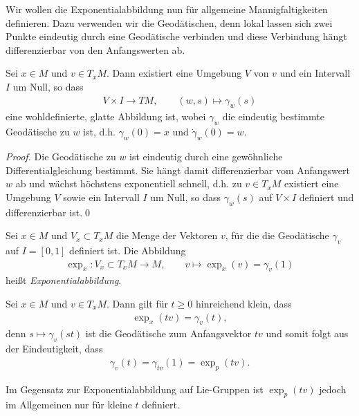 \documentclass[%
	paper=a5,%
	fleqn,%
	DIV=18,%
	BCOR=0mm,
	fontsize=11pt,
	titlepage=false,%
	bibliography=totoc,
	DIV=18,%
	twoside=true,
	pdftitle=Riemannsche Geometrie,
	pdfauthor=Uwe Semmelmann,
	numbers=noendperiod]%
	{scrbook}
\begin{document}
Wir wollen die Exponentialabbildung nun für allgemeine Mannigfaltigkeiten
definieren. Dazu verwenden wir die Geodätischen, denn lokal lassen sich zwei Punkte
eindeutig durch eine Geodätische verbinden und diese Verbindung hängt
differenzierbar von den Anfangswerten ab.

\begin{lem}
Sei $x\in M$ und $v\in T_xM$. Dann existiert eine Umgebung $V$ von $v$ und ein
Intervall $I$ um Null, so dass
\begin{align*}
 V\times I\to TM,\qquad (w,s)\mapsto \gamma_w(s)
\end{align*}
eine wohldefinierte, glatte Abbildung ist, wobei $\gamma_w$ die eindeutig
bestimmte Geodätische zu $w$ ist, d.h. $\gamma_w(0) = x$ und $\dot{\gamma}_w(0)
= w$.\fish
\end{lem}

\begin{proof}
Die Geodätische zu $w$ ist eindeutig durch eine gewöhnliche
Differentialgleichung bestimmt. Sie hängt damit differenzierbar
vom Anfangswert $w$ ab und wächst höchstens exponentiell schnell, d.h.
zu $v\in T_xM$ existiert eine Umgebung $V$ sowie ein Intervall $I$ um Null, so
dass $\gamma_w(s)$ auf $V\times I$ definiert und differenzierbar ist.\qed
\end{proof}

\begin{defn}
Sei $x\in M$ und $V_x\subset T_xM$ die Menge der Vektoren $v$, für die die
Geodätische $\gamma_v$ auf $I=[0,1]$ definiert ist. Die Abbildung
\begin{align*}
\exp_x : V_x\subset T_xM\to M,\qquad v\mapsto \exp_x(v) = \gamma_v(1)
\end{align*}
heißt \emph{Exponentialabbildung}.\fish
\end{defn}


\begin{rem}
Sei $x\in M$ und $v\in T_xM$. Dann gilt für
$t\ge 0$ hinreichend klein, dass
\begin{align*}
\exp_x(tv) = \gamma_v(t),
\end{align*}
denn $s\mapsto \gamma_v(st)$ ist die Geodätische zum Anfangsvektor $tv$ und
somit folgt aus der Eindeutigkeit, dass
\begin{align*}
\gamma_v(t) = \gamma_{tv}(1) = \exp_p(tv). 
\end{align*}

Im Gegensatz zur Exponentialabbildung auf Lie-Gruppen ist $\exp_p(tv)$ jedoch
im Allgemeinen nur für kleine $t$ definiert.\map 
\end{rem}
\end{document}
